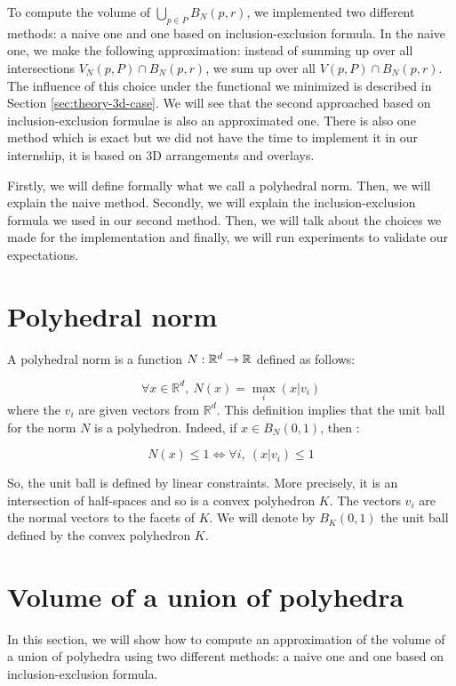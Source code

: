 To compute the volume of $ \bigcup_{p \in P} B_N(p, r) $, we implemented two
different methods: a naive one and one based on inclusion-exclusion formula.  In
the naive one, we make the following approximation: instead of summing up over
all intersections $ V_N(p, P) \cap B_N(p, r) $, we sum up over all $ V(p, P)
\cap B_N(p, r) $. The influence of this choice under the functional we minimized
is described in Section \ref{sec:theory-3d-case}. We will see that the second
approached based on inclusion-exclusion formulae is also an approximated one.
There is also one method which is exact but we did not have the time to
implement it in our internship, it is based on 3D arrangements and overlays.

Firstly, we will define formally what we call a polyhedral norm. Then, we will
explain the naive method. Secondly, we will explain the inclusion-exclusion
formula we used in our second method. Then, we will talk about the choices we
made for the implementation and finally, we will run experiments to validate our
expectations.

\section{Polyhedral norm}
\label{sec:polyhedral-norm}
A polyhedral norm is a function $ N : \mathbb{R}^d \to \mathbb{R} $ defined as follows:

\begin{equation}
    \forall x \in \mathbb{R}^d,~ N(x) = \max_{i} (x | v_i)
\end{equation}
where the $ v_i $ are given vectors from $ \mathbb{R}^d $. This definition
implies that the unit ball for the norm $ N $ is a polyhedron. Indeed, if $ x
\in B_N(0, 1) $, then :

$$ N(x) \leq 1 \Longleftrightarrow \forall i,~(x | v_i) \leq 1 $$

So, the unit ball is defined by linear constraints. More precisely, it is an
intersection of half-spaces and so is a convex polyhedron $ K $. The vectors $
v_i $ are the normal vectors to the facets of $ K $. We will denote by $ B_K(0,
1) $ the unit ball defined by the convex polyhedron $ K $.

\section{Volume of a union of polyhedra}

In this section, we will show how to compute an approximation of the volume of
a union of polyhedra using two different methods: a naive one and one based on
inclusion-exclusion formula.

